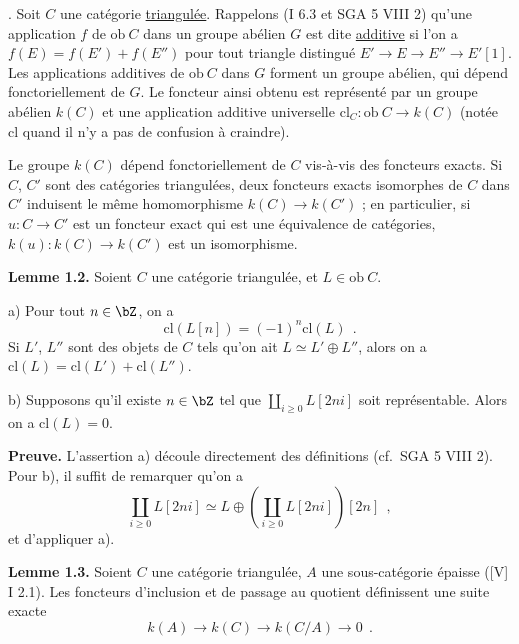 . Soit $C$ une cat\'{e}gorie \underline{triangul\'{e}e}. Rappelons (I 6.3 et SGA 5 VIII 2) qu'une application $f$ de $\mathrm{ob}\ C$ dans un groupe ab\'{e}lien $G$ est dite \underline{additive} si l'on a $f(E) = f(E') + f(E'')$ pour tout triangle distingu\'{e} $E' \longrightarrow E \longrightarrow E'' \longrightarrow E'[1]$. Les applications additives de $\mathrm{ob}\ C$ dans $G$ forment un groupe ab\'{e}lien, qui d\'{e}pend fonctoriellement de $G$. Le foncteur ainsi obtenu est repr\'{e}sent\'{e} par un groupe ab\'{e}lien $k(C)$ et une application additive universelle $\mathrm{cl}_C : \mathrm{ob}\ C \longrightarrow k(C)$ (not\'{e}e $\mathrm{cl}$ quand il n'y a pas de confusion \`{a} craindre).

Le groupe $k(C)$ d\'{e}pend fonctoriellement de $C$ vis-\`{a}-vis des foncteurs exacts. Si $C$, $C'$ sont des cat\'{e}gories triangul\'{e}es, deux foncteurs exacts isomorphes de $C$ dans $C'$ induisent le m\^{e}me homomorphisme $k(C) \longrightarrow k(C')$ ; en particulier, si $u : C \longrightarrow C'$ est un foncteur exact qui est une \'{e}quivalence de cat\'{e}gories, $k(u) : k(C) \longrightarrow k(C')$ est un isomorphisme.

\medskip

\noindent\textbf{Lemme 1.2.} Soient $C$ une cat\'{e}gorie triangul\'{e}e, et $L \in \mathrm{ob}\ C$.

\smallskip

\noindent a) Pour tout $n \in \bZ$, on a
\[
\mathrm{cl}(L[n]) = (-1)^n \mathrm{cl}(L)\ \ .
\]
Si $L'$, $L''$ sont des objets de $C$ tels qu'on ait $L \simeq L' \oplus L''$, alors on a $\mathrm{cl}(L) = \mathrm{cl}(L') + \mathrm{cl}(L'')$.

\smallskip

\noindent b) Supposons qu'il existe $n \in \bZ$ tel que $\coprod_{i \geq 0} L[2ni]$ soit repr\'{e}sentable. Alors on a $\mathrm{cl}(L) = 0$.

\medskip

\noindent\textbf{Preuve.} L'assertion a) d\'{e}coule directement des d\'{e}finitions (cf.\ SGA 5 VIII 2). Pour b), il suffit de remarquer qu'on a
\[
\coprod_{i \geq 0} L[2ni] \simeq L \oplus (\coprod_{i \geq 0} L[2ni])[2n]\ \ ,
\]
et d'appliquer a).

\medskip

\noindent\textbf{Lemme 1.3.} Soient $C$ une cat\'{e}gorie triangul\'{e}e, $A$ une sous-cat\'{e}gorie \'{e}paisse ([V] I 2.1). Les foncteurs d'inclusion et de passage au quotient d\'{e}finissent une suite exacte
\[
k(A) \longrightarrow k(C) \longrightarrow k(C/A) \longrightarrow 0\ \ .
\]

